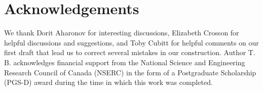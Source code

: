 \documentclass[11pt,letterpaper]{article}
\newcommand{\<}{\langle}
\renewcommand{\>}{\rangle}
\begin{document}
\section{Acknowledgements}

We thank Dorit Aharonov for interesting discussions, Elizabeth Crosson for helpful discussions and suggestions, and Toby Cubitt for helpful comments on our first draft that lead us to correct several mistakes in our construction. Author T. B. acknowledges financial support from the National Science and Engineering Research Council of Canada (NSERC) in the form of a Postgraduate Scholarship (PGS-D) award during the time in which this work was completed.





\end{document}
